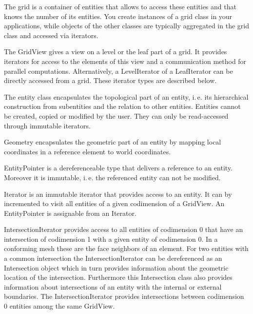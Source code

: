 \documentclass[11pt,a4paper,headinclude,footinclude,DIV16,headings=normal]{scrreprt}
\begin{document}
    The grid
    is a container of entities that allows to access these entities
    and that knows the number of its entities. You create instances of
    a grid class in your applications, while objects of the other
    classes are typically aggregated in the grid class and accessed via
    iterators.


    The GridView gives a view on a level or the leaf part of a grid. It
    provides iterators for access to the elements of this view and a
    communication method for parallel computations. Alternatively, a
    LevelIterator of a LeafIterator  can be directly accessed from a grid.
    These iterator types are described below.


    The entity class encapsulates
    the topological part of an entity, i.\,e. its hierarchical
    construction from subentities and the relation to other
    entities. Entities cannot be created, copied or modified by the
    user. They can only be read-accessed through immutable iterators.


    Geometry
    encapsulates the geometric part of an entity by mapping local
    coordinates in a reference element to world coordinates.


    EntityPointer  is a
    dereferenceable type that delivers a reference to an
    entity. Moreover it is immutable, i.\,e. the referenced entity can
    not be modified.


    Iterator is an
    immutable iterator that provides access to an entity. It can by
    incremented to visit all entities of a given
    codimension of a GridView. An EntityPointer is assignable
    from an Iterator.


    IntersectionIterator provides access to all entities of
    codimension 0 that have an intersection of codimension 1 with a
    given entity of codimension 0. In a conforming mesh these are the
    face neighbors of an element. For two entities with a common
    intersection the IntersectionIterator can be dereferenced as an Intersection
    object which in turn provides information about the geometric location of
    the intersection.  Furthermore this Intersection class also provides
    information about intersections of an entity
    with
    the internal or external boundaries.
    The IntersectionIterator provides intersections between
    codimension 0 entities among the same GridView.
\end{document}
